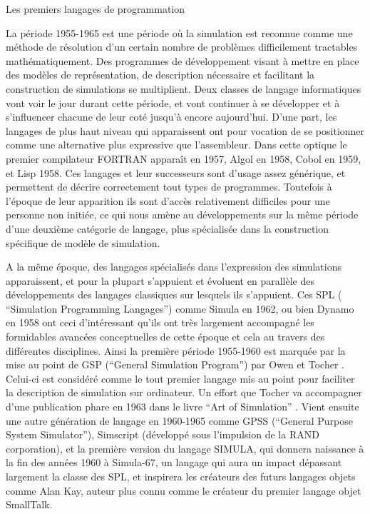 \begin{framewithtitle}{ Les premiers langages de programmation }

La période 1955-1965 est une période où la simulation est reconnue comme une méthode de résolution d'un certain nombre de problèmes difficilement tractables mathématiquement.\autocite{Nance1993, Ackoff1961} Des programmes de développement visant à mettre en place des modèles de représentation, de description nécessaire et facilitant la construction de simulations se multiplient. Deux classes de langage informatiques vont voir le jour durant cette période, et vont continuer à se développer et à s'influencer chacune de leur coté jusqu'à encore aujourd'hui. D'une part, les langages de plus haut niveau qui apparaissent ont pour vocation de se positionner comme une alternative plus expressive que l'assembleur. Dans cette optique le premier compilateur FORTRAN apparaît en 1957,  Algol en 1958, Cobol en 1959, et Lisp 1958. Ces langages et leur successeurs sont d'usage assez générique, et permettent de décrire correctement tout types de programmes. Toutefois à l'époque de leur apparition ils sont d'accès relativement difficiles pour une personne non initiée, ce qui nous amène au développements sur la même période d'une deuxième catégorie de langage, plus spécialisée dans la construction spécifique de modèle de simulation. \autocite[239]{Naylor1966}

A la même époque, des langages spécialisés dans l'expression des simulations apparaissent, et pour la plupart s'appuient et évoluent en parallèle des développements des langages classiques sur lesquels ils s'appuient. Ces SPL ( \foreignquote{english}{Simulation Programming Langages}) comme Simula en 1962, ou bien Dynamo en 1958 ont ceci d'intéressant qu'ils ont très largement accompagné les formidables avancées conceptuelles de cette époque et cela au travers des différentes disciplines. Ainsi la première période 1955-1960 est marquée par la mise au point de GSP (\foreignquote{english}{General Simulation Program}) par Owen et Tocher \autocite{Tocher1960}. Celui-ci est considéré comme le tout premier langage mis au point pour faciliter la description de simulation sur ordinateur. Un effort que Tocher va accompagner d'une publication phare en 1963 dans le livre \foreignquote{english}{Art of Simulation} \autocite{Tocher1963} . Vient ensuite une autre génération de langage en 1960-1965 comme GPSS (\foreignquote{english}{General Purpose System Simulator}), Simscript (développé sous l'impulsion de la RAND corporation), et la première version du langage SIMULA, qui donnera naissance à la fin des années 1960 à Simula-67, un langage qui aura un impact dépassant largement la classe des SPL, et inspirera les créateurs des futurs langages objets comme Alan Kay, auteur plus connu comme le créateur du premier langage objet SmallTalk. 


\end{framewithtitle}
